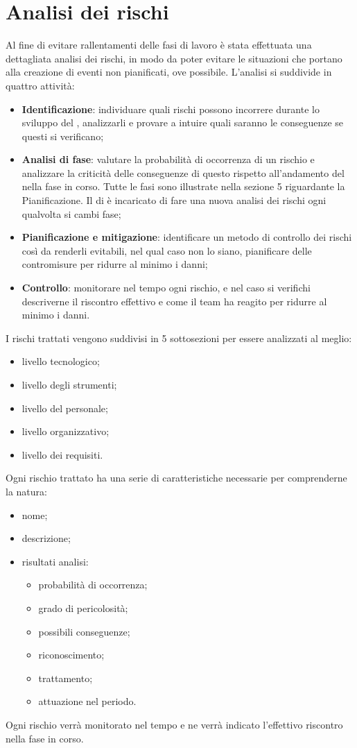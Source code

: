 \documentclass[PianoDiProgetto.tex]{subfiles}
\begin{document}
\section{Analisi dei rischi}
Al fine di evitare rallentamenti delle fasi di lavoro è stata effettuata una dettagliata analisi dei rischi, in modo da poter evitare le situazioni che portano alla creazione di eventi non pianificati, ove possibile. L'analisi si suddivide in quattro attività:
	\begin{itemize}
		\item \textbf{Identificazione}: individuare quali rischi possono incorrere durante lo sviluppo del , analizzarli e provare a intuire quali saranno le conseguenze se questi si verificano;
		\item \textbf{Analisi di fase}: valutare la probabilità di occorrenza di un rischio e analizzare la criticità delle conseguenze di questo rispetto all'andamento del  nella fase in corso. Tutte le fasi sono illustrate nella sezione 5 riguardante la Pianificazione. Il \RESP{} di  è incaricato  di fare una nuova analisi dei rischi ogni qualvolta si cambi fase;
		\item \textbf{Pianificazione e mitigazione}: identificare un metodo di controllo dei rischi così da renderli evitabili, nel qual caso non lo siano, pianificare delle contromisure per ridurre al minimo i danni; 
		\item \textbf{Controllo}: monitorare nel tempo ogni rischio, e nel caso si verifichi descriverne il riscontro effettivo e come il team ha reagito per ridurre al minimo i danni. 
	\end{itemize}
I rischi trattati vengono suddivisi in 5 sottosezioni per essere analizzati al meglio:
	\begin{itemize}
		\item livello tecnologico;
		\item livello degli strumenti;
		\item livello del personale;
		\item livello organizzativo;
		\item livello dei requisiti.
	\end{itemize}
Ogni rischio trattato ha una serie di caratteristiche necessarie per comprenderne la natura:
	\begin{itemize}
		\item nome;
		\item descrizione;
		\item risultati analisi:
			\begin{itemize}
				\item probabilità di occorrenza;
				\item grado di pericolosità;
				\item possibili conseguenze;
				\item riconoscimento;
				\item trattamento;
				\item attuazione nel periodo.
			\end{itemize}
	\end{itemize}
Ogni rischio verrà monitorato nel tempo e ne verrà indicato l’effettivo riscontro nella fase in corso.
\end{document}
